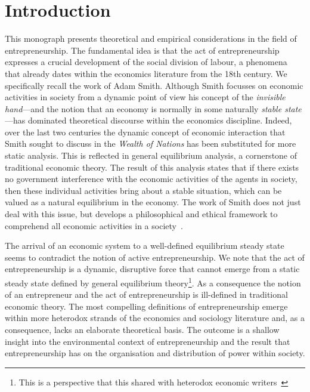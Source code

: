 \setcounter{page}{1} 
\chapter{Introduction}

This monograph presents theoretical and empirical considerations in the field of entrepreneurship. The fundamental idea is that the act of entrepreneurship expresses a crucial development of the social division of labour, a phenomena that already dates within the economics literature from the 18th century. We specifically recall the work of Adam Smith. Although Smith focusses on economic activities in society from a dynamic point of view his concept of the \emph{invisible hand}---and the notion that an economy is normally in some naturally \emph{stable state}---has dominated theoretical discourse within the economics discipline. Indeed, over the last two centuries the dynamic concept of economic interaction that Smith sought to discuss in the \emph{Wealth of Nations} has been substituted for more static analysis. This is reflected in general equilibrium analysis, a cornerstone of traditional economic theory. The result of this analysis states that if there exists no government interference with the economic activities of the agents in society, then these individual activities bring about a stable situation, which can be valued as a natural equilibrium in the economy. The work of Smith does not just deal with this issue, but develops a philosophical and ethical framework to comprehend all economic activities in a society~\citep{Gilles1990}.


The arrival of an economic system to a well-defined equilibrium steady state seems to contradict the notion of active entrepreneurship. We note that the act of entrepreneurship is a dynamic, disruptive force that cannot emerge from a static steady state defined by general equilibrium theory\footnote{This is a perspective that this shared with heterodox economic writers~\citep{Schumpeter1942}}. As a consequence the notion of an entrepreneur and the act of entrepreneurship is ill-defined in traditional economic theory. The most compelling definitions of entrepreneurship emerge within more heterodox strands of the economics and sociology literature and, as a consequence, lacks an elaborate theoretical basis. The outcome is a shallow insight into the environmental context of entrepreneurship and the result that entrepreneurship has on the organisation and distribution of power within society.

